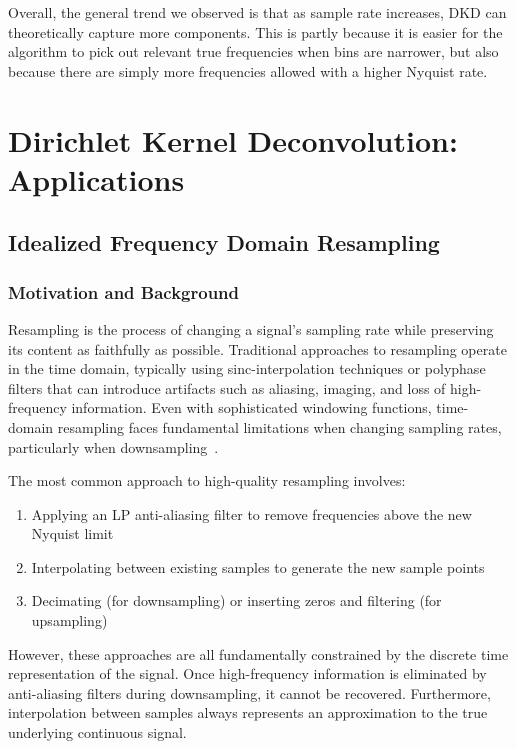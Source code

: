 \documentclass[11pt,twoside]{report}
\numberwithin{thm}{section}
\numberwithin{equation}{section}
\begin{document}
Overall, the general trend we observed is that as sample rate increases, DKD can theoretically capture more components. This is partly because it is easier for the algorithm to pick out relevant true frequencies when bins are narrower, but also because there are simply more frequencies allowed with a higher Nyquist rate.



\chapter{Dirichlet Kernel Deconvolution: Applications}
\label{ch:5}
\section{Idealized Frequency Domain Resampling}
\label{sec:resample}

\subsection{Motivation and Background}

Resampling is the process of changing a signal's sampling rate while preserving its content as faithfully as possible. Traditional approaches to resampling operate in the time domain, typically using sinc-interpolation techniques or polyphase filters that can introduce artifacts such as aliasing, imaging, and loss of high-frequency information. Even with sophisticated windowing functions, time-domain resampling faces fundamental limitations when changing sampling rates, particularly when downsampling~\cite{RESAMPLE}.

The most common approach to high-quality resampling involves:
\begin{enumerate}
    \item Applying an LP anti-aliasing filter to remove frequencies above the new Nyquist limit
    \item Interpolating between existing samples to generate the new sample points
    \item Decimating (for downsampling) or inserting zeros and filtering (for upsampling)
\end{enumerate}

However, these approaches are all fundamentally constrained by the discrete time representation of the signal. Once high-frequency information is eliminated by anti-aliasing filters during downsampling, it cannot be recovered. Furthermore, interpolation between samples always represents an approximation to the true underlying continuous signal.
\end{document}
